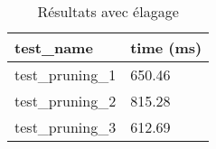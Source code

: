 \begin{table}[!ht]
    \centering
    \begin{tabular}{@{}ll@{}}
        test\_name & time (ms) \\ \midrule
        test\_pruning\_1 & 650.46    \\
        test\_pruning\_2 & 815.28    \\
        test\_pruning\_3 & 612.69
    \end{tabular}
    \caption{Résultats avec élagage}
\end{table}
